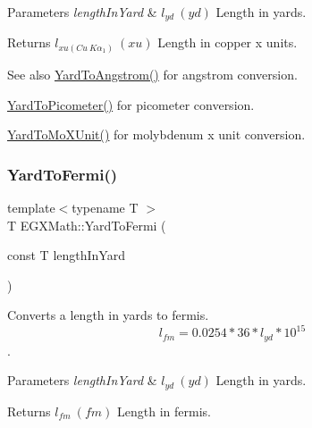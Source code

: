 \begin{DoxyParams}{Parameters}
{\em length\+In\+Yard} & $ l_{yd}\ (yd)$ Length in yards. \\
\hline
\end{DoxyParams}
\begin{DoxyReturn}{Returns}
$ l_{xu(Cu\ K\alpha_1)}\ (xu)$ Length in copper x units. 
\end{DoxyReturn}
\begin{DoxySeeAlso}{See also}
\mbox{\hyperlink{group___e_g_x_math-_conversions-_length_conversions-_imperial-_yard-_non-_s_i_gaacff083bdc6b954da2e4b63f857cb429}{Yard\+To\+Angstrom()}} for angstrom conversion. 

\mbox{\hyperlink{group___e_g_x_math-_conversions-_length_conversions-_imperial-_yard-_s_i_ga1d0bc498fe3ed1693555aa6917abb758}{Yard\+To\+Picometer()}} for picometer conversion. 

\mbox{\hyperlink{group___e_g_x_math-_conversions-_length_conversions-_imperial-_yard-_non-_s_i_ga81f1fa776a2154865e8ee4be46ef693d}{Yard\+To\+Mo\+X\+Unit()}} for molybdenum x unit conversion. 
\end{DoxySeeAlso}
\mbox{\label{group___e_g_x_math-_conversions-_length_conversions-_imperial-_yard-_non-_s_i_ga796a8607338fefb728574de07375543f}} 
\subsubsection{\texorpdfstring{Yard\+To\+Fermi()}{YardToFermi()}}
{\footnotesize\ttfamily template$<$typename T $>$ \\
T E\+G\+X\+Math\+::\+Yard\+To\+Fermi (\begin{DoxyParamCaption}\item[{const T}]{length\+In\+Yard }\end{DoxyParamCaption})}



Converts a length in yards to fermis. \[ l_{fm}=0.0254 * 36 * l_{yd} * 10^{15} \]. 


\begin{DoxyParams}{Parameters}
{\em length\+In\+Yard} & $ l_{yd}\ (yd)$ Length in yards. \\
\hline
\end{DoxyParams}
\begin{DoxyReturn}{Returns}
$ l_{fm}\ (fm)$ Length in fermis. 
\end{DoxyReturn}
\mbox{\label{group___e_g_x_math-_conversions-_length_conversions-_imperial-_yard-_non-_s_i_ga7d167f52b344853fd58dcc589e0ad301}} 
